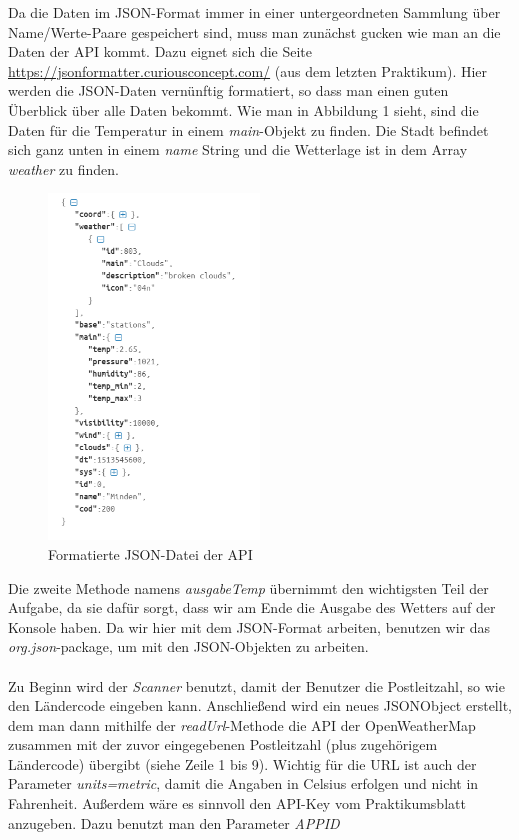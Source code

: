 Da die Daten im JSON-Format immer in einer untergeordneten Sammlung über Name/Werte-Paare gespeichert sind, muss man zunächst gucken wie man an die Daten der API kommt. Dazu eignet sich die Seite \url{https://jsonformatter.curiousconcept.com/} (aus dem letzten Praktikum). Hier werden die JSON-Daten vernünftig formatiert, so dass man einen guten Überblick über alle Daten bekommt. Wie man in Abbildung 1 sieht, sind die Daten für die Temperatur in einem \textit{main}-Objekt zu finden. Die Stadt befindet sich ganz unten in einem \textit{name} String und die Wetterlage ist in dem Array \textit{weather} zu finden.

\begin{figure}[htbp]
\begin{center}
\includegraphics[width=0.5\textwidth]{Bild1}
\caption{Formatierte JSON-Datei der API}
\end{center}
\end{figure}

Die zweite Methode namens \textit{ausgabeTemp} übernimmt den wichtigsten Teil der Aufgabe, da sie dafür sorgt, dass wir am Ende die Ausgabe des Wetters auf der Konsole haben. Da wir hier mit dem JSON-Format arbeiten, benutzen wir das \textit{org.json}-package, um mit den JSON-Objekten zu arbeiten. \\
\\
Zu Beginn wird der \textit{Scanner} benutzt, damit der Benutzer die Postleitzahl, so wie den Ländercode eingeben kann. Anschließend wird ein neues JSONObject erstellt, dem man dann mithilfe der \textit{readUrl}-Methode die API der OpenWeatherMap zusammen mit der zuvor eingegebenen Postleitzahl (plus zugehörigem Ländercode) übergibt (siehe Zeile 1 bis 9). Wichtig für die URL ist auch der Parameter \textit{units=metric}, damit die Angaben in Celsius erfolgen und nicht in Fahrenheit. Außerdem wäre es sinnvoll den API-Key vom Praktikumsblatt anzugeben. Dazu benutzt man den Parameter \textit{APPID}\\
\\


